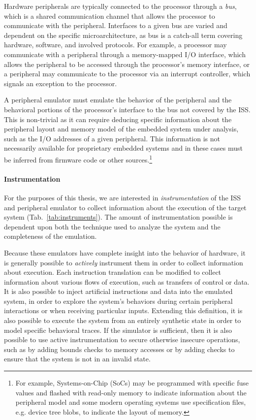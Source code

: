 Hardware peripherals are typically connected to the processor through a \emph{bus}, which is a shared communication channel that allows the processor to communicate with the peripheral.
Interfaces to a given bus are varied and dependent on the specific microarchitecture, as bus is a catch-all term covering hardware, software, and involved protocols.
For example, a processor may communicate with a peripheral through a memory-mapped I/O interface, which allows the peripheral to be accessed through the processor's memory interface, or a peripheral may communicate to the processor via an interrupt controller, which signals an exception to the processor.

A peripheral emulator must emulate the behavior of the peripheral and the behavioral portions of the processor's interface to the bus not covered by the ISS.
This is non-trivial as it can require deducing specific information about the peripheral layout and memory model of the embedded system under analysis, such as the I/O addresses of a given peripheral.
This information is not necessarily available for proprietary embedded systems and in these cases must be inferred from firmware code or other sources.\footnote{For example, Systems-on-Chip (SoCs) may be programmed with specific fuse values and flashed with read-only memory to indicate information about the peripheral model and some modern operating systems use specification files, e.g. device tree blobs, to indicate the layout of memory.}

\paragraph{Instrumentation}

For the purposes of this thesis, we are interested in \emph{instrumentation} of the ISS and peripheral emulator to collect information about the execution of the target system (Tab.~\ref{tab:instruments}).
The amount of instrumentation possible is dependent upon both the technique used to analyze the system and the completeness of the emulation.

Because these emulators have complete insight into the behavior of hardware, it is generally possible to \emph{actively} instrument them in order to collect information about execution.
Each instruction translation can be modified to collect information about various flows of execution, such as transfers of control or data.
It is also possible to inject artificial instructions and data into the emulated system, in order to explore the system's behaviors during certain peripheral interactions or when receiving particular inputs.
Extending this definition, it is also possible to execute the system from an entirely synthetic state in order to model specific behavioral traces.
If the simulator is sufficient, then it is also possible to use active instrumentation to secure otherwise insecure operations, such as by adding bounds checks to memory accesses or by adding checks to ensure that the system is not in an invalid state.

